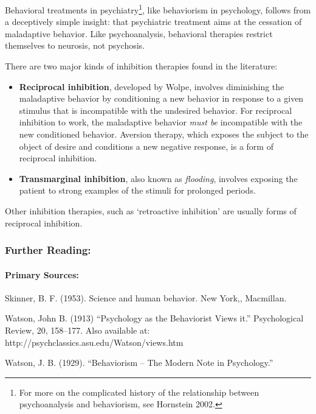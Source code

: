 Behavioral treatments in psychiatry\footnote{For more on the complicated history of the relationship between psychoanalysis and behaviorism, see Hornstein 2002.}, like behaviorism in psychology, follows from a deceptively simple insight: that psychiatric treatment aims at the cessation of maladaptive behavior. Like psychoanalysis, behavioral therapies restrict themselves to neurosis, not psychosis.

There are two major kinds of inhibition therapies found in the literature:

\begin{itemize}
\item \textbf{Reciprocal inhibition}, developed by Wolpe, involves diminishing the maladaptive behavior by conditioning a new behavior in response to a given stimulus that is incompatible with the undesired behavior. For reciprocal inhibition to work, the maladaptive behavior \emph{must be} incompatible with the new conditioned behavior. Aversion therapy, which exposes the subject to the object of desire and conditions a new negative response, is a form of reciprocal inhibition.

\item \textbf{Transmarginal inhibition}, also known as \emph{flooding}, involves exposing the patient to strong examples of the stimuli for prolonged periods.

\end{itemize}

Other inhibition therapies, such as `retroactive inhibition' are usually forms of reciprocal inhibition.

\subsubsection{Further Reading:}
\label{furtherreading:}

\paragraph{Primary Sources:}
\label{primarysources:}

Skinner, B. F. (1953). Science and human behavior. New York,, Macmillan.

Watson, John B. (1913) ``Psychology as the Behaviorist Views it.'' Psychological Review, 20, 158--177. Also available at: http:\slash \slash psychclassics.asu.edu\slash Watson\slash views.htm

Watson, J. B. (1929). ``Behaviorism -- The Modern Note in Psychology.''


